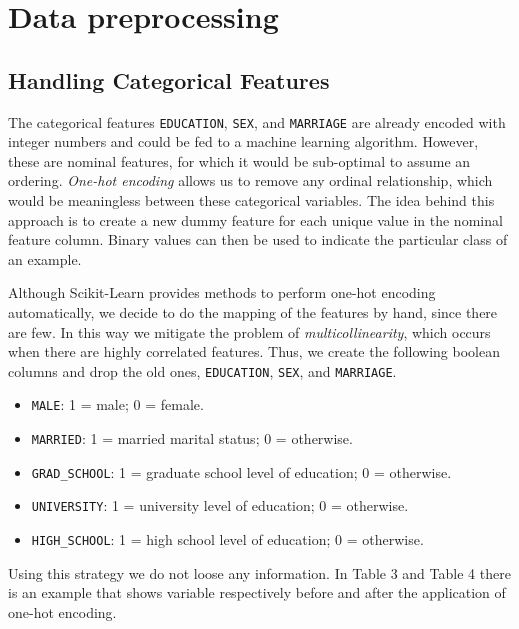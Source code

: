 \documentclass{article}
\begin{document}
\newpage
\section{Data preprocessing}
\subsection{Handling Categorical Features}
The categorical features \texttt{EDUCATION}, \texttt{SEX}, and \texttt{MARRIAGE} are already encoded with integer numbers and could be fed to a machine learning algorithm. However, these are nominal features, for which it would be sub-optimal to assume an ordering. \emph{One-hot encoding} allows us to remove any ordinal relationship, which would be meaningless between these categorical variables. The idea behind this approach is to create a new dummy feature for each unique value in the nominal feature column. Binary values can then be used to indicate the particular class of an example.

Although Scikit-Learn provides methods to perform one-hot encoding automatically, we decide to do the mapping of the features by hand, since there are few. In this way we mitigate the problem of \emph{multicollinearity}, which occurs when there are highly correlated features. Thus, we create the following boolean columns and drop the old ones, \texttt{EDUCATION}, \texttt{SEX}, and \texttt{MARRIAGE}.

\begin{itemize}
    \item \texttt{MALE}: 1 = male; 0 = female.
    \item \texttt{MARRIED}: 1 = married marital status; 0 = otherwise.
    \item \texttt{GRAD\_SCHOOL}: 1 = graduate school level of education; 0 = otherwise.
    \item \texttt{UNIVERSITY}: 1 = university level of education; 0 = otherwise.
    \item \texttt{HIGH\_SCHOOL}: 1 = high school level of education; 0 = otherwise.
\end{itemize}

Using this strategy we do not loose any information.
In Table 3 and Table 4 there is an example that shows variable respectively before and after the application of one-hot encoding.
\end{document}
